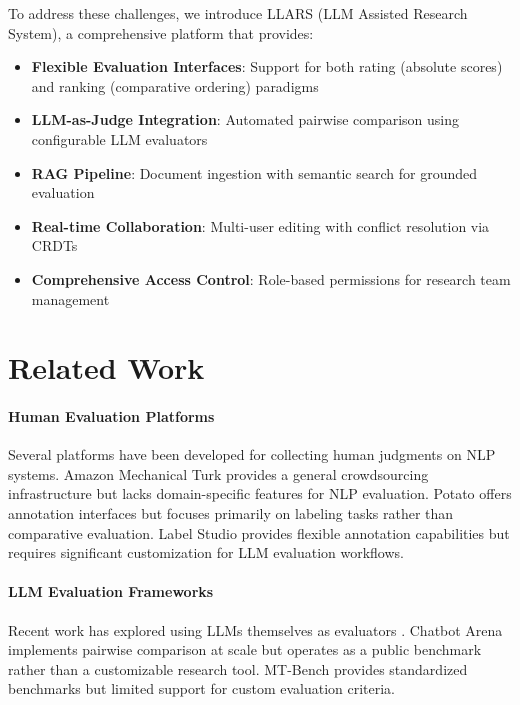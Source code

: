 \documentclass[11pt]{article}
\begin{document}
To address these challenges, we introduce LLARS (LLM Assisted Research System), a comprehensive platform that provides:

\begin{itemize}
    \item \textbf{Flexible Evaluation Interfaces}: Support for both rating (absolute scores) and ranking (comparative ordering) paradigms
    \item \textbf{LLM-as-Judge Integration}: Automated pairwise comparison using configurable LLM evaluators
    \item \textbf{RAG Pipeline}: Document ingestion with semantic search for grounded evaluation
    \item \textbf{Real-time Collaboration}: Multi-user editing with conflict resolution via CRDTs
    \item \textbf{Comprehensive Access Control}: Role-based permissions for research team management
\end{itemize}

\section{Related Work}

\paragraph{Human Evaluation Platforms}
Several platforms have been developed for collecting human judgments on NLP systems.
Amazon Mechanical Turk \cite{crowston2012amazon} provides a general crowdsourcing infrastructure but lacks domain-specific features for NLP evaluation.
Potato \cite{pei2022potato} offers annotation interfaces but focuses primarily on labeling tasks rather than comparative evaluation.
Label Studio provides flexible annotation capabilities but requires significant customization for LLM evaluation workflows.

\paragraph{LLM Evaluation Frameworks}
Recent work has explored using LLMs themselves as evaluators \cite{zheng2023judging}.
Chatbot Arena \cite{chiang2024chatbot} implements pairwise comparison at scale but operates as a public benchmark rather than a customizable research tool.
MT-Bench \cite{zheng2023judging} provides standardized benchmarks but limited support for custom evaluation criteria.
\end{document}
